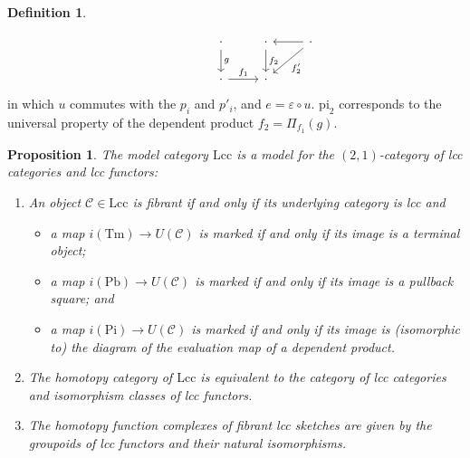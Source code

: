 \documentclass[a4paper]{article}
\newtheorem{proposition}[theorem]{Proposition}
\theoremstyle{remark}
\theoremstyle{definition}
\newtheorem{definition}[theorem]{Definition}
\begin{document}
\begin{definition}
\begin{itemize}
\begin{equation}
\begin{tikzcd}
          & & \cdot \arrow[d, "g"] & \cdot \arrow[d, "f_2"] & \cdot \arrow[dl, "f'_2"] \arrow[l] \\
          & & \cdot \arrow[r, "f_1"] & \cdot
        \end{tikzcd}
      \end{equation}
      in which $u$ commutes with the $p_i$ and $p'_i$, and $e = \varepsilon \circ u$.
      $\mathrm{pi}_2$ corresponds to the universal property of the dependent product $f_2 = \Pi_{f_1}(g)$.
  \end{itemize}
\end{definition}

\begin{proposition}
  \label{prop:lcc-model-cat}
  The model category $\mathrm{Lcc}$ is a model for the $(2, 1)$-category of lcc categories and lcc functors:
  \begin{enumerate}
    \item
      \label{itm:lcc-fibrant-objects}
      An object $\mathcal{C} \in \mathrm{Lcc}$ is fibrant if and only if its underlying category is lcc and
      \begin{itemize}
        \item
          a map $i(\mathrm{Tm}) \rightarrow U(\mathcal{C})$ is marked if and only if its image is a terminal object;
        \item
          a map $i(\mathrm{Pb}) \rightarrow U(\mathcal{C})$ is marked if and only if its image is a  pullback square; and
        \item
          a map $i(\mathrm{Pi}) \rightarrow U(\mathcal{C})$ is marked if and only if its image is (isomorphic to) the diagram of the evaluation map of a dependent product.
      \end{itemize}
    \item
      \label{itm:lcc-homotopy-category}
      The homotopy category of $\mathrm{Lcc}$ is equivalent to the category of lcc categories and isomorphism classes of lcc functors.
    \item
      \label{itm:lcc-homotopy-function-complexes}
      The homotopy function complexes of fibrant lcc sketches are given by the groupoids of lcc functors and their natural isomorphisms.
  \end{enumerate}
\end{proposition}
\end{document}
